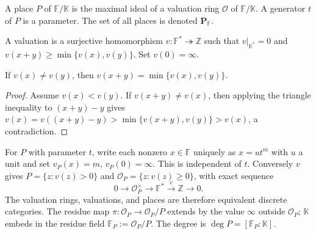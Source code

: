 \begin{definition}[Place]
\label{par-def-place}
\uses{}
A place $P$ of $\mathbb F/\mathbb K$ is the maximal ideal of a valuation ring
$\mathcal O$ of $\mathbb F/\mathbb K$. A generator $t$ of $P$ is a parameter.
The set of all places is denoted $\mathbf P_{\mathbb F}$.
\end{definition}

\begin{definition}
\label{par-def-valuation}
\uses{}
A valuation is a surjective homomorphism
$v:\mathbb F^*\twoheadrightarrow\mathbb Z$ such that
$v|_{\mathbb K^*}=0$ and $v(x+y)\geq\min\{v(x),v(y)\}$. Set $v(0)=\infty$.
\end{definition}

\begin{theorem}
\label{par-thm-valuation-strict}
\uses{}
If $v(x)\neq v(y)$, then $v(x+y)=\min\{v(x),v(y)\}$.
\end{theorem}
\begin{proof}
Assume $v(x)<v(y)$. If $v(x+y)\neq v(x)$, then applying the triangle inequality
to $(x+y)-y$ gives
$v(x)=v((x+y)-y)>\min\{v(x+y),v(y)\}>v(x)$, a contradiction.
\end{proof}

\begin{definition}
\label{par-def-place-valuation}
\uses{}
For $P$ with parameter $t$, write each nonzero $x\in\mathbb F$ uniquely as
$x=ut^m$ with $u$ a unit and set $v_P(x)=m$, $v_P(0)=\infty$. This is
independent of $t$. Conversely $v$ gives
$P=\{z:v(z)>0\}$ and $\mathcal O_P=\{z:v(z)\geq0\}$, with exact sequence
\[
0\longrightarrow\mathcal O_P^\times\longrightarrow\mathbb F^*
\xrightarrow{v}\mathbb Z\longrightarrow0.
\]
The valuation rings, valuations, and places are therefore equivalent discrete
categories. The residue map $\pi:\mathcal O_P\to\mathcal O_P/P$ extends by
the value $\infty$ outside $\mathcal O_P$; $\mathbb K$ embeds in the residue
field $\mathbb F_P:=\mathcal O_P/P$. The degree is $\deg P=[\mathbb F_P:\mathbb K]$.
\end{definition}

